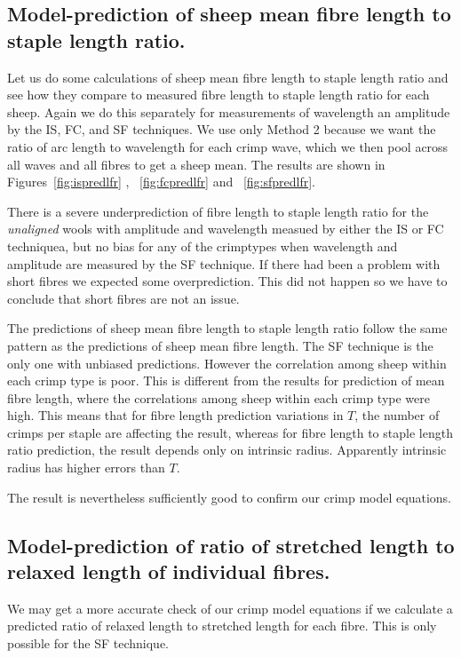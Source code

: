 \documentclass[titlepage,10pt]{article}  %
\begin{document}
\subsection{Model-prediction of sheep mean fibre length to staple length ratio.}
Let us do some calculations of sheep mean fibre length to staple length ratio  and see how they compare to measured fibre length to staple length ratio for each sheep. Again we do this separately for measurements of wavelength an amplitude by the IS, FC, and SF techniques. We use only Method 2 because we want the ratio of arc length to wavelength for each crimp wave, which we then pool across all waves and all fibres to get a sheep mean. The results are shown in Figures~\ref{fig:ispredlfr} , ~\ref{fig:fcpredlfr} and ~\ref{fig:sfpredlfr}.






 There is a severe underprediction of fibre length to staple length ratio for the {\em unaligned} wools with amplitude and wavelength measued by either the IS or FC techniquea, but no bias for any of the crimptypes when wavelength and amplitude are measured by the SF technique. If there had been a problem with short fibres we expected some overprediction. This did not happen so we have to conclude that short fibres are not an issue.

The predictions of sheep mean fibre length to staple length ratio follow the same pattern as the predictions of sheep mean fibre length. The SF technique is the only one with unbiased predictions. However the correlation among sheep within each crimp type is poor. This is different from the results for prediction of mean fibre length, where the correlations among sheep within each crimp type were high. This means that for fibre length prediction variations in $T$, the number of crimps per staple are affecting the result, whereas for fibre length to staple length ratio  prediction, the result depends only on intrinsic radius. Apparently intrinsic radius has higher errors than $T$.

The result is nevertheless sufficiently good to confirm our crimp model equations.

\subsection{Model-prediction of ratio of stretched length to relaxed length of individual fibres.}
We may get a more accurate check of our crimp model equations if we calculate a predicted ratio of relaxed length to stretched length for each fibre. This is only possible for the SF technique.
\end{document}

